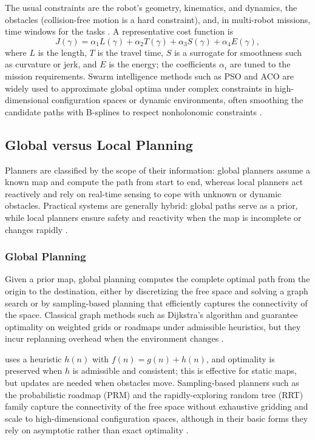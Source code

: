 The usual constraints are the robot's geometry, kinematics, and dynamics, the
obstacles (collision-free motion is a hard constraint), and, in multi-robot
missions, time windows for the tasks \cite{lin2022review}. A representative cost
function is
\begin{equation}
  J(\gamma) = \alpha_1 L(\gamma) + \alpha_2 T(\gamma) + \alpha_3 S(\gamma)
              + \alpha_4 E(\gamma),
  \label{eq:cost-function}
\end{equation}
where $L$ is the length, $T$ is the travel time, $S$ is a surrogate for
smoothness such as curvature or jerk, and $E$ is the energy; the coefficients
$\alpha_i$ are tuned to the mission requirements. Swarm intelligence methods such
as PSO and ACO are widely used to approximate global optima under complex
constraints in high-dimensional configuration spaces or dynamic environments,
often smoothing the candidate paths with B-splines to respect nonholonomic
constraints \cite{panigrahi2011handbook}.

\subsection{Global versus Local Planning}\label{sec:global-local}

Planners are classified by the scope of their information: global planners
assume a known map and compute the path from start to end, whereas local
planners act reactively and rely on real-time sensing to cope with unknown or
dynamic obstacles. Practical systems are generally hybrid: global paths serve as
a prior, while local planners ensure safety and reactivity when the map is
incomplete or changes rapidly \cite{hamann2018swarm,nguyen2024swarm}.

\subsubsection{Global Planning}

Given a prior map, global planning computes the complete optimal path from the
origin to the destination, either by discretizing the free space and solving a
graph search or by sampling-based planning that efficiently captures the
connectivity of the space. Classical graph methods such as Dijkstra's algorithm
and \Astar{} guarantee optimality on weighted grids or roadmaps under admissible
heuristics, but they incur replanning overhead when the environment changes
\cite{hamann2018swarm}.

\Astar{} uses a heuristic $h(n)$ with $f(n) = g(n) + h(n)$, and optimality is
preserved when $h$ is admissible and consistent; this is effective for static
maps, but updates are needed when obstacles move. Sampling-based planners such as
the probabilistic roadmap (PRM) and the rapidly-exploring random tree (RRT)
family capture the connectivity of the free space without exhaustive gridding and
scale to high-dimensional configuration spaces, although in their basic forms
they rely on asymptotic rather than exact optimality \cite{nguyen2024swarm}.

